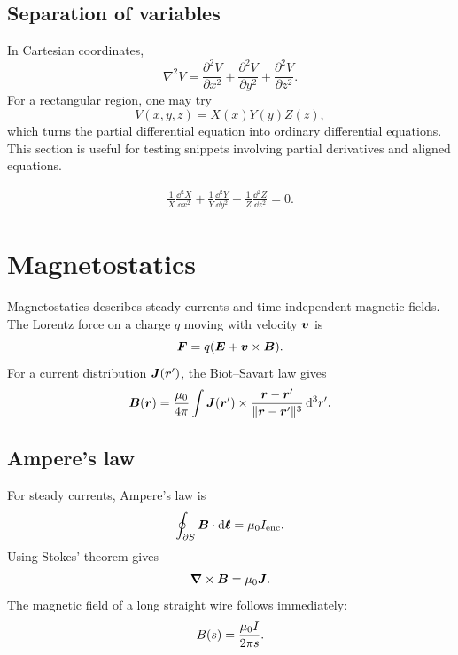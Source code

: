 \subsection{Separation of variables}

In Cartesian coordinates,
\begin{equation}
  \nabla^2 V
  =
  \frac{\partial^2 V}{\partial x^2}
  +
  \frac{\partial^2 V}{\partial y^2}
  +
  \frac{\partial^2 V}{\partial z^2}.
\end{equation}
For a rectangular region, one may try
\begin{equation}
  V(x,y,z)=X(x)Y(y)Z(z),
\end{equation}
which turns the partial differential equation into ordinary differential equations.
This section is useful for testing snippets involving partial derivatives and aligned equations.

\begin{align}
  \frac{1}{X}\frac{\dd^2X}{\dd x^2}
  +
  \frac{1}{Y}\frac{\dd^2Y}{\dd y^2}
  +
  \frac{1}{Z}\frac{\dd^2Z}{\dd z^2}
  = 0.
  \label{eq:separation}
\end{align}

\newpage

\section{Magnetostatics}
\label{sec:magnetostatics}

Magnetostatics describes steady currents and time-independent magnetic fields.
The Lorentz force on a charge \(q\) moving with velocity \(\bm{v}\) is
\begin{equation}
  \bm{F}=q(\bm{E}+\bm{v}\times\bm{B}).
  \label{eq:lorentz-force}
\end{equation}
For a current distribution \(\bm{J}(\bm{r}')\), the Biot--Savart law gives
\begin{equation}
  \bm{B}(\bm{r})
  =
  \frac{\mu_0}{4\pi}
  \int
  \bm{J}(\bm{r}')
  \times
  \frac{\bm{r}-\bm{r}'}
       {\lVert \bm{r}-\bm{r}'\rVert^3}
  \mathop{}\!\mathrm{d}^3r'.
  \label{eq:biot-savart}
\end{equation}

\subsection{Ampere's law}

For steady currents, Ampere's law is
\begin{equation}
  \oint_{\partial S} \bm{B}\cdot \mathop{}\!\mathrm{d}\bm{\ell}
  =
  \mu_0 I_{\mathrm{enc}}.
  \label{eq:ampere-integral}
\end{equation}
Using Stokes' theorem gives
\begin{equation}
  \bm{\nabla} \times \bm{B} = \mu_0 \bm{J}.
  \label{eq:ampere-differential}
\end{equation}
The magnetic field of a long straight wire follows immediately:
\begin{equation}
  B(s) = \frac{\mu_0 I}{2\pi s}.
  \label{eq:wire-field}
\end{equation}

